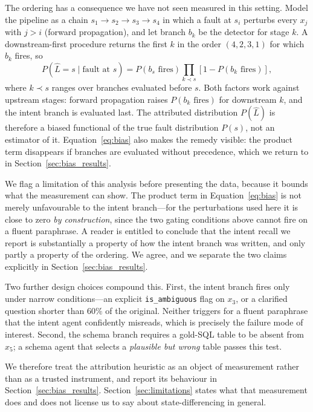 \documentclass[conference]{IEEEtran}
\begin{document}
The ordering has a consequence we have not seen measured in this setting. Model
the pipeline as a chain $s_1 \to s_2 \to s_3 \to s_4$ in which a fault at
$s_i$ perturbs every $x_j$ with $j > i$ (forward propagation), and let branch
$b_k$ be the detector for stage $k$. A downstream-first procedure returns the
first $k$ in the order $(4,2,3,1)$ for which $b_k$ fires, so
\begin{equation}
P(\hat{L}=s \mid \text{fault at } s) = P(b_s \text{ fires})\!\!\prod_{k \prec s}\!\! \left[1 - P(b_k \text{ fires})\right],
\label{eq:bias}
\end{equation}
where $k \prec s$ ranges over branches evaluated before $s$. Both factors work
against upstream stages: forward propagation raises $P(b_k \text{ fires})$ for
downstream $k$, and the intent branch is evaluated last. The attributed
distribution $P(\hat{L})$ is therefore a biased functional of the true fault
distribution $P(s)$, not an estimator of it. Equation~\eqref{eq:bias} also makes
the remedy visible: the product term disappears if branches are evaluated
without precedence, which we return to in Section~\ref{sec:bias_results}.

We flag a limitation of this analysis before presenting the data, because it
bounds what the measurement can show. The product term in
Equation~\eqref{eq:bias} is not merely unfavourable to the intent branch---for
the perturbations used here it is close to zero \emph{by construction}, since
the two gating conditions above cannot fire on a fluent paraphrase. A reader is
entitled to conclude that the intent recall we report is substantially a
property of how the intent branch was written, and only partly a property of
the ordering. We agree, and we separate the two claims explicitly in
Section~\ref{sec:bias_results}.

Two further design choices compound this. First, the intent branch fires only
under narrow conditions---an explicit \texttt{is\_ambiguous} flag on $x_3$, or
a clarified question shorter than $60\%$ of the original. Neither triggers for
a fluent paraphrase that the intent agent confidently misreads, which is
precisely the failure mode of interest. Second, the schema branch requires a
gold-SQL table to be absent from $x_5$; a schema agent that selects a
\emph{plausible but wrong} table passes this test.

We therefore treat the attribution heuristic as an object of measurement rather
than as a trusted instrument, and report its behaviour in
Section~\ref{sec:bias_results}. Section~\ref{sec:limitations} states what that
measurement does and does not license us to say about state-differencing in
general.
\end{document}
